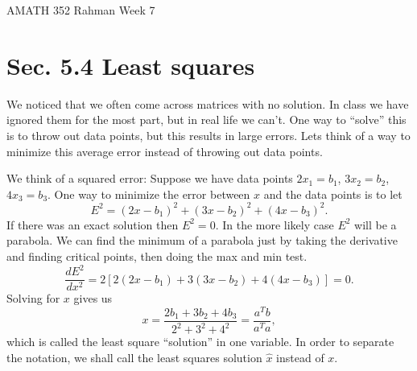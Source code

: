 \documentclass[reqno]{amsart}
\theoremstyle{definition}
\begin{document}
\begin{flushleft}
{\sc \Large AMATH 352 Rahman} \hfill Week 7
\bigskip
\end{flushleft}

\newcommand{\R}{\mathbb{R}}
\newcommand{\N}{\mathbb{N}}
\newcommand{\Z}{\mathbb{Z}}
\newcommand{\Q}{\mathbb{Q}}
\renewcommand{\CancelColor}{\color{red}}
\newcommand{\?}{\stackrel{?}{=}}
\renewcommand{\varphi}{\phi}
\newcommand{\card}{\text{Card}}
\newcommand{\bigzero}{\text{\Huge 0}}
\newcommand{\curvearrowdown}{{\color{red}\rotatebox{90}{$\curvearrowleft$}}}
\newcommand{\curvearrowup}{{\color{red}\rotatebox{90}{$\curvearrowright$}}}

\newcommand*\circled[1]{\color{red}\tikz[baseline=(char.base)]{
            \node[shape=circle,draw,inner sep=2pt] (char) {#1};}}



\section*{Sec. 5.4 Least squares}

We noticed that we often come across matrices with no solution.  In class we have ignored them for the
most part, but in real life we can't.  One way to ``solve'' this is to throw out data points, but this results
in large errors.  Lets think of a way to minimize this average error instead of throwing out data points.

We think of a squared error:  Suppose we have data points $2x_1 = b_1$, $3x_2 = b_2$, $4x_3 = b_3$.
One way to minimize the error between $x$ and the data points is to let
%
\begin{equation*}
E^2 = (2x - b_1)^2 + (3x - b_2)^2 + (4x - b_3)^2.
\end{equation*}
%
If there was an exact solution then $E^2 = 0$.  In the more likely case $E^2$ will be a parabola.  We can find
the minimum of a parabola just by taking the derivative and finding critical points, then doing the max and min
test.
%
\begin{equation*}
\frac{dE^2}{dx^2} = 2[2(2x - b_1) + 3(3x - b_2) + 4(4x - b_3)] = 0.
\end{equation*}
%
Solving for $x$ gives us
%
\begin{equation*}
x = \frac{2b_1 + 3b_2 + 4b_3}{2^2 + 3^2 + 4^2} = \frac{a^Tb}{a^Ta},
\end{equation*}
%
which is called the least square ``solution'' in one variable.  In order to separate the notation, we shall call
the least squares solution $\hat{x}$ instead of $x$.
\end{document}
